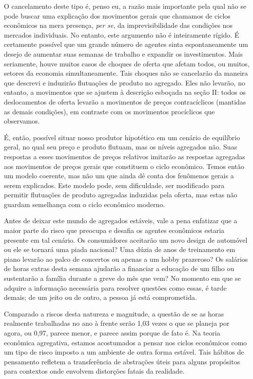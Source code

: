 \documentclass[12pt]{article}
\begin{document}
O cancelamento deste tipo é, penso eu, a razão mais importante pela qual não se pode buscar uma explicação dos movimentos gerais que chamamos de ciclos econômicos na mera presença, \textit{per se}, da imprevisibilidade das condições nos mercados individuais. No entanto, este argumento não é inteiramente rígido. É certamente possível que um grande número de agentes sinta espontaneamente um desejo de aumentar suas semanas de trabalho e expandir os investimentos. Mais seriamente, houve muitos casos de choques de oferta que afetam todos, ou muitos, setores da economia simultaneamente. Tais choques não se cancelarão da maneira que descrevi e induzirão flutuações de produto no agregado. Eles não levarão, no entanto, a movimentos que se ajustem à descrição esboçada na seção II: todos os deslocamentos de oferta levarão a movimentos de preços contracíclicos (mantidas as demais condições), em contraste com os movimentos procíclicos que observamos.

É, então, possível situar nosso produtor hipotético em um cenário de equilíbrio geral, no qual seu preço e produto flutuam, mas os níveis agregados não. Suas respostas a esses movimentos de preços relativos imitarão as respostas agregadas aos movimentos de preços gerais que constituem o ciclo econômico. Temos então um modelo coerente, mas não um que ainda dê conta dos fenômenos gerais a serem explicados. Este modelo pode, sem dificuldade, ser modificado para permitir flutuações de produto agregadas induzidas pela oferta, mas estas não guardam semelhança com o ciclo econômico moderno.

Antes de deixar este mundo de agregados estáveis, vale a pena enfatizar que a maior parte do risco que preocupa e desafia os agentes econômicos estaria presente em tal cenário. Os consumidores aceitarão um novo design de automóvel ou ele se tornará uma piada nacional? Uma dúzia de anos de treinamento em piano levarão ao palco de concertos ou apenas a um hobby prazeroso? Os salários de horas extras desta semana ajudarão a financiar a educação de um filho ou sustentarão a família durante a greve do mês que vem? No momento em que se adquire a informação necessária para resolver questões como essas, é tarde demais; de um jeito ou de outro, a pessoa já está comprometida.

Comparado a riscos desta natureza e magnitude, a questão de se as horas realmente trabalhadas no ano à frente serão 1,03 vezes o que se planeja por agora, ou 0,97, parece menor, e parece assim porque de fato é. Na teoria econômica agregativa, estamos acostumados a pensar nos ciclos econômicos como um tipo de risco imposto a um ambiente de outra forma estável. Tais hábitos de pensamento refletem a transferência de abstrações úteis para alguns propósitos para contextos onde envolvem distorções fatais da realidade.
\end{document}
